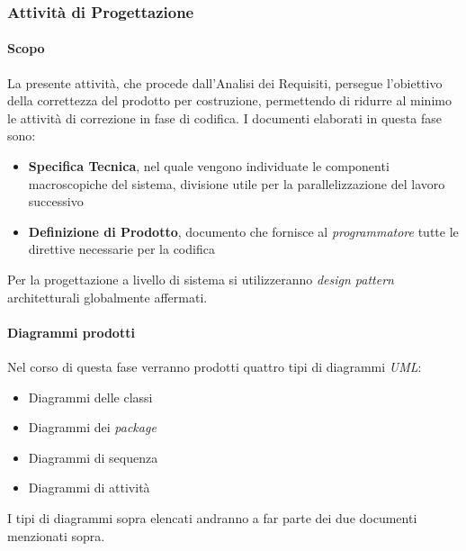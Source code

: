 			
		\subsubsection{Attività di Progettazione}
			\paragraph*{Scopo}
		        La presente attivit\`a, che procede dall'Analisi dei Requisiti, persegue l'obiettivo
		        della correttezza del prodotto per costruzione, permettendo di ridurre al minimo le attività di correzione
		        in fase di codifica.
                        I documenti elaborati in questa fase sono:
                        \begin{itemize}
                        \item \textbf{Specifica Tecnica}, nel quale vengono individuate le componenti macroscopiche del sistema,
                          divisione utile per la parallelizzazione del lavoro successivo
                        \item \textbf{Definizione di Prodotto}, documento che fornisce al \textit{programmatore} tutte le direttive necessarie per la codifica
                        \end{itemize}
		        Per la progettazione a livello di sistema si utilizzeranno \textit{design pattern} architetturali globalmente affermati.
                 
                        \paragraph*{Diagrammi prodotti}
                        Nel corso di questa fase verranno prodotti quattro tipi di diagrammi \textit{UML}:
                        \begin{itemize}
                        \item Diagrammi delle classi
                        \item Diagrammi dei \textit{package}
                        \item Diagrammi di sequenza
                        \item Diagrammi di attivit\`a
                        \end{itemize}
                        I tipi di diagrammi sopra elencati andranno a far parte dei due documenti menzionati sopra.
		
